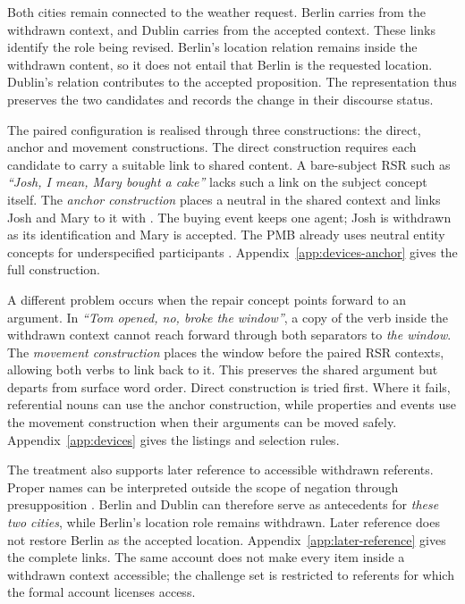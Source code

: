 \documentclass{article}
\begin{document}
Both cities remain connected to the weather request. Berlin carries
 from the withdrawn context, and Dublin carries
 from the accepted context. These links identify the
role being revised. Berlin's location relation remains inside the withdrawn
content, so it does not entail that Berlin is the requested location. Dublin's
relation contributes to the accepted proposition. The representation thus
preserves the two candidates and records the change in their discourse status.

The paired configuration is realised through three constructions: the direct,
anchor and movement constructions. The direct construction requires each
candidate to carry a suitable link to shared content. A bare-subject RSR such
as \textit{``Josh, I mean, Mary
bought a cake''} lacks such a link on the subject concept itself. The
\emph{anchor construction} places a neutral  in the shared
context and links Josh and Mary to it with . The buying event
keeps one agent; Josh is withdrawn as its identification and Mary is accepted.
The PMB already uses neutral entity concepts for underspecified participants
\citep{abzianidzeParallelMeaningBank2017}. Appendix~\ref{app:devices-anchor}
gives the full construction.

A different problem occurs when the repair concept points forward to an
argument. In \textit{``Tom opened, no, broke the window''}, a copy of the
verb inside the withdrawn context cannot reach forward through both separators
to \textit{the window}. The \emph{movement construction} places the window before
the paired RSR contexts, allowing both verbs to link back to it. This preserves the
shared argument but departs from surface word order. Direct construction is
tried first. Where it fails, referential nouns can use the anchor construction,
while properties and events use the movement construction when their arguments
can be moved safely.
Appendix~\ref{app:devices} gives the listings and selection rules.

The treatment also supports later reference to accessible withdrawn
referents. Proper names can be interpreted outside the scope of negation
through presupposition
\citep[Section~7]{bosVariablefreeDiscourseRepresentation2021}. Berlin and
Dublin can therefore serve as antecedents for \textit{these two cities}, while
Berlin's location role remains withdrawn. Later reference does not restore
Berlin as the accepted location. Appendix~\ref{app:later-reference} gives the
complete  links. The same account does not make every item inside
a withdrawn context accessible; the challenge set is restricted to referents
for which the formal account licenses access.
\end{document}
